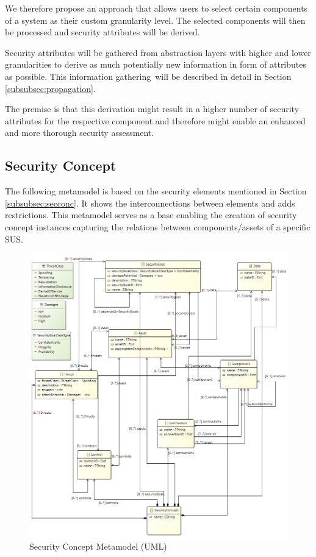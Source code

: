We therefore propose an approach that allows users to select certain components of a system as their custom granularity level. The selected components will then be processed and security attributes will be derived.
 
Security attributes will be gathered from abstraction layers with higher and lower granularities to derive as much potentially new information in form of attributes as possible. This \glqq information gathering\grqq \ will be described in detail in Section \ref{subsubsec:propagation}.

The premise is that this derivation might result in a higher number of security attributes for the respective component and therefore might enable an enhanced and more thorough security assessment.

\subsection{Security Concept}
\label{subsec:sec_concept}
The following metamodel is based on the security elements mentioned in Section \ref{subsubsec:secconc}. It shows the interconnections between elements and adds restrictions. This metamodel serves as a base enabling the creation of security concept instances capturing the relations between components/assets of a specific SUS. 

\begin{figure}[H]
\centering
\includegraphics[width=1.1\textwidth]{pictures/concept_metamodel.png}
\caption{Security Concept Metamodel (UML)}
\label{fig:concept_metamodel}
\end{figure}

